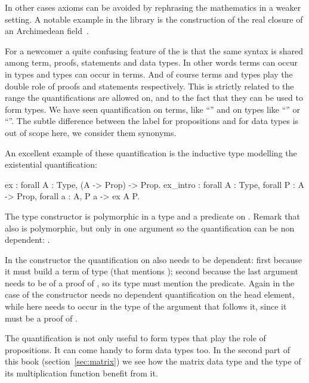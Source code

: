 In other cases axioms can be avoided by rephrasing the mathematics
in a weaker setting.  A notable example in the \mcbMC{} library
is the construction of the real closure of an Archimedean
field~\cite{DBLP:conf/itp/Cohen12}.



For a newcomer
a quite confusing feature of the \mcbCIC{} is that the same syntax
is shared among term, proofs, statements and data types.  In other words terms
can occur in types and types can occur in terms.  And of course terms and
types play the double role of proofs and statements respectively.
This is strictly related to the range the quantifications are allowed on,
and to the fact that they can be used to form types.
We have seen quantification on terms, like ``'' and on types
like ``'' or ``''.  The subtle difference
between the label  for propositions and  for data types
is out of scope here, we consider them synonyms.

An excellent example of these quantification is the inductive type
modelling the existential quantification:

\begin{coq}{}{}
ex : forall A : Type, (A -> Prop) -> Prop.
ex_intro : forall A : Type, forall P : A -> Prop, forall a : A, P a -> ex A P.
\end{coq}

The  type constructor is polymorphic in a type  and a predicate
on .  Remark that also  is polymorphic, but only in one argument
so the quantification can be non dependent: .

In the constructor  the quantification on  also needs to be
dependent: first because it must build a term of type  (that
mentions ); second because the last argument needs to be of a proof of
, so its type must mention the predicate.  Again in the case of 
the constructor  needs no dependent
quantification on the head element, while here  needs to occur in
the type of the argument that follows it, since it must be a proof of
.

The  quantification is not only useful to form types that
play the role of propositions.  It can come handy to form data types
too.  In the second part of this book (section~\ref{sec:matrix})
we see how the matrix data type
and the type of its multiplication function benefit from it.

